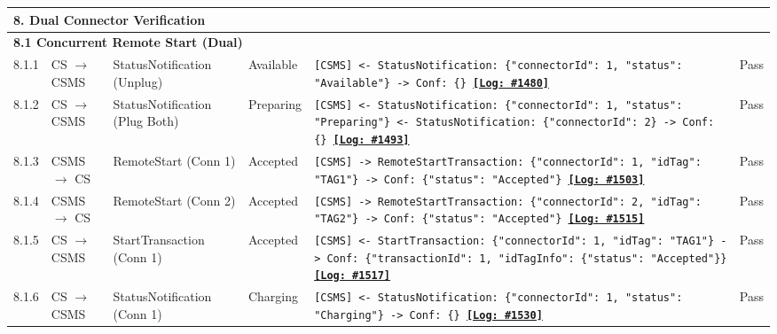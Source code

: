 \documentclass[10pt, a4paper, landscape]{article}
\begin{document}
\begin{longtable}{|p{1.0cm}|p{2.5cm}|p{4.0cm}|p{5.0cm}|p{10.0cm}|c|}
\multicolumn{6}{|l|}{\cellcolor{blue!10}\textbf{8. Dual Connector Verification}} \\
\hline
\multicolumn{6}{|l|}{\textbf{8.1 Concurrent Remote Start (Dual)}} \\
\hline
8.1.1 & CS $\to$ CSMS & StatusNotification (Unplug) & Available & \footnotesize\texttt{[CSMS] <- StatusNotification: \{"connectorId": 1, "status": "Available"\} \newline [CSMS] -> Conf: \{\} \newline \hyperref[log:8.1.1]{\textbf{[Log: \#1480]}}} & Pass \\
\hline
8.1.2 & CS $\to$ CSMS & StatusNotification (Plug Both) & Preparing & \footnotesize\texttt{[CSMS] <- StatusNotification: \{"connectorId": 1, "status": "Preparing"\} \newline [CSMS] <- StatusNotification: \{"connectorId": 2\} \newline [CSMS] -> Conf: \{\} \newline \hyperref[log:8.1.2]{\textbf{[Log: \#1493]}}} & Pass \\
\hline
8.1.3 & CSMS $\to$ CS & RemoteStart (Conn 1) & Accepted & \footnotesize\texttt{[CSMS] -> RemoteStartTransaction: \{"connectorId": 1, "idTag": "TAG1"\} \newline [CS] -> Conf: \{"status": "Accepted"\} \newline \hyperref[log:8.1.3]{\textbf{[Log: \#1503]}}} & Pass \\
\hline
8.1.4 & CSMS $\to$ CS & RemoteStart (Conn 2) & Accepted & \footnotesize\texttt{[CSMS] -> RemoteStartTransaction: \{"connectorId": 2, "idTag": "TAG2"\} \newline [CS] -> Conf: \{"status": "Accepted"\} \newline \hyperref[log:8.1.4]{\textbf{[Log: \#1515]}}} & Pass \\
\hline
8.1.5 & CS $\to$ CSMS & StartTransaction (Conn 1) & Accepted & \footnotesize\texttt{[CSMS] <- StartTransaction: \{"connectorId": 1, "idTag": "TAG1"\} \newline [CSMS] -> Conf: \{"transactionId": 1, "idTagInfo": \{"status": "Accepted"\}\} \newline \hyperref[log:8.1.5]{\textbf{[Log: \#1517]}}} & Pass \\
\hline
8.1.6 & CS $\to$ CSMS & StatusNotification (Conn 1) & Charging & \footnotesize\texttt{[CSMS] <- StatusNotification: \{"connectorId": 1, "status": "Charging"\} \newline [CSMS] -> Conf: \{\} \newline \hyperref[log:8.1.6]{\textbf{[Log: \#1530]}}} & Pass \\

\end{longtable}
\end{document}
